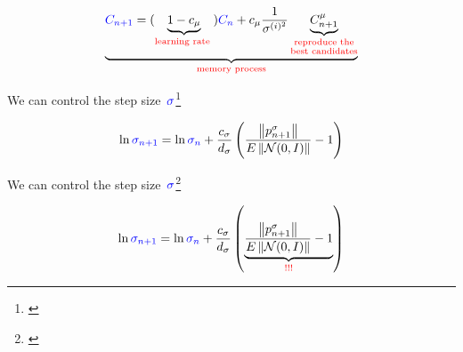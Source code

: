 \documentclass[11pt, aspectratio=169]{beamer}
\begin{document}
\addtocounter{framenumber}{-1}

\begin{frame}{}
  \vspace{1.5cm}
  \begin{align*}
    \underbrace{\textcolor{blue}{C_{n+1}} = (\underbrace{1-c_{\mu}}_{\text{\textcolor{red}{learning rate }}})\textcolor{blue}{C_{n}}+c_{\mu}\frac{1}{\sigma^{(i)^2}}\underbrace{C_{n+1}^{\mu}}_{\substack{\text{\textcolor{red}{reproduce the}}\\ \text{\textcolor{red}{best candidates}}}}}_{\text{\textcolor{red}{memory process}}}
  \end{align*}
  \end{frame}


\begin{frame}

  We can control the step size~$\textcolor{blue}{\sigma}$\footnote[4]{\cite{aguirre2026covariance}}

  \begin{align*}
    \ln\textcolor{blue}{\sigma_{n+1}} = \ln\textcolor{blue}{\sigma_{n}} + \frac{c_{\sigma}}{d_{\sigma}}\left( \frac{\left\| p_{n+1}^{\sigma} \right\|}{E\left\| \mathcal{N}(0,I) \right\|}-1\right)
  \end{align*}
\end{frame}

\addtocounter{framenumber}{-1}

\begin{frame}

  We can control the step size~$\textcolor{blue}{\sigma}$\footnote[4]{\cite{aguirre2026covariance}}

  \begin{align*}
    \ln\textcolor{blue}{\sigma_{n+1}} = \ln\textcolor{blue}{\sigma_{n}} + \frac{c_{\sigma}}{d_{\sigma}}\left( \underbrace{\frac{\left\| p_{n+1}^{\sigma} \right\|}{E\left\| \mathcal{N}(0,I) \right\|}-1}_{\textcolor{red}{!!!}}\right)
  \end{align*}
\end{frame}

\addtocounter{framenumber}{-1}
\end{document}
